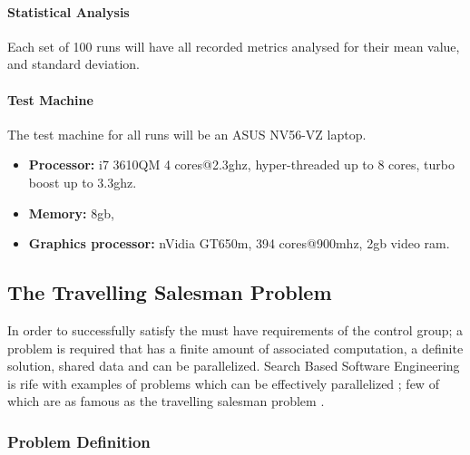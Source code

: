 \documentclass[12pt,a4paper]{article}
\begin{document}
\paragraph{Statistical Analysis}
Each set of 100 runs will have all recorded metrics analysed for their mean value, and standard deviation.

\paragraph{Test Machine}
The test machine for all runs will be an ASUS NV56-VZ laptop. 

\begin{itemize} \itemsep0pt
  \item \textbf{Processor:} i7 3610QM 4 cores@2.3ghz, hyper-threaded up to 8 cores, turbo boost up to 3.3ghz.
  \item \textbf{Memory:} 8gb, 
  \item \textbf{Graphics processor:} nVidia GT650m, 394 cores@900mhz, 2gb video ram.
\end{itemize}

\subsection{The Travelling Salesman Problem}

In order to successfully satisfy the must have requirements of the control group; a problem is required that has a finite amount of associated computation, a definite solution, shared data and can be parallelized. Search Based Software Engineering is rife with examples of problems which can be effectively parallelized \cite{gpuMinimisation}; few of which are as famous as the travelling salesman problem \cite{tsp}.

\subsubsection{Problem Definition}
\end{document}
